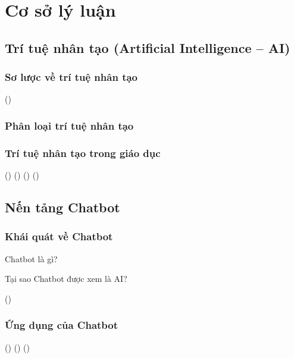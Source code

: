 \chapter{Cơ sở lý luận}

\section{Trí tuệ nhân tạo (Artificial Intelligence – AI)}
\subsection{Sơ lược về trí tuệ nhân tạo}
(\cite{nguyen2018tri})

\subsection{Phân loại trí tuệ nhân tạo}

\subsection{Trí tuệ nhân tạo trong giáo dục}
(\cite{garito1991artificial})
(\cite{beck1996applications})
(\cite{goksel2019artificial})
(\cite{devedvzic2004web})

\section{Nến tảng Chatbot}
\subsection{Khái quát về Chatbot}
Chatbot là gì?\par
Tại sao Chatbot được xem là AI?\par
(\cite{bii2013chatbot})

\subsection{Ứng dụng của Chatbot}
(\cite{10.1007/978-3-030-01689-0_23})
(\cite{hoang2011ung})
(\cite{hsu2012mobile})


